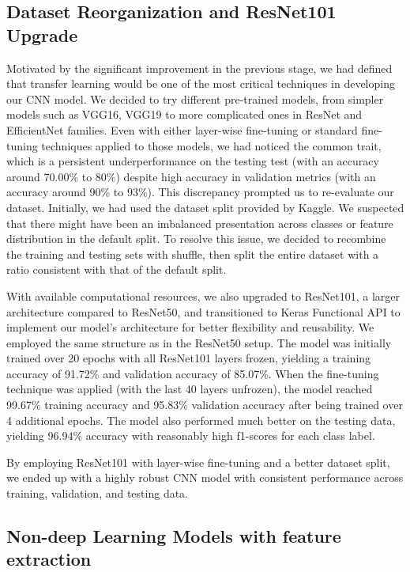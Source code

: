 \documentclass[conference]{IEEEtran}
\begin{document}
\subsection{\large Dataset Reorganization and ResNet101 Upgrade}

Motivated by the significant improvement in the previous stage, we had defined that transfer learning would be one of the most critical techniques in developing our CNN model. We decided to try different pre-trained models, from simpler models such as VGG16, VGG19 to more complicated ones in ResNet and EfficientNet families. Even with either layer-wise fine-tuning or standard fine-tuning techniques applied to those models, we had noticed the common trait, which is a persistent underperformance on the testing test (with an accuracy around 70.00\% to 80\%) despite high accuracy in validation metrics (with an accuracy around 90\% to 93\%). This discrepancy prompted us to re-evaluate our dataset. Initially, we had used the dataset split provided by Kaggle. We suspected that there might have been an imbalanced presentation across classes or feature distribution in the default split. To resolve this issue, we decided to recombine the training and testing sets with shuffle, then split the entire dataset with a ratio consistent with that of the default split. \ 

With available computational resources, we also upgraded to ResNet101, a larger architecture compared to ResNet50, and transitioned to Keras Functional API to implement our model's architecture for better flexibility and reusability. We employed the same structure as in the ResNet50 setup. The model was initially trained over 20 epochs with all ResNet101 layers frozen, yielding a training accuracy of 91.72\% and validation accuracy of 85.07\%. When the fine-tuning technique was applied (with the last 40 layers unfrozen), the model reached 99.67\% training accuracy and 95.83\% validation accuracy after being trained over 4 additional epochs. The model also performed much better on the testing data, yielding 96.94\% accuracy with reasonably high f1-scores for each class label.

By employing ResNet101 with layer-wise fine-tuning and a better dataset split, we ended up with a highly robust CNN model with consistent performance across training, validation, and testing data.

\subsection{\large Non-deep Learning Models with feature extraction}
\end{document}
